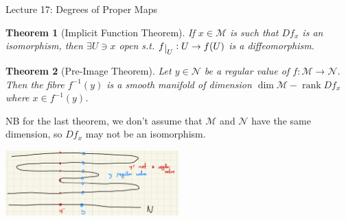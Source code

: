 \documentclass[10pt]{article}
\theoremstyle{plain}
\newtheorem{thm}{Theorem}[section] %
\theoremstyle{definition}
\newcommand{\man}{\mathcal{M}}
\newcommand{\nan}{\mathcal{N}}
\def\restrict#1{\raise-.5ex\hbox{\ensuremath|}_{#1}}
\DeclareMathOperator{\rank}{rank}
\begin{document}
\begin{section}{Lecture 17: Degrees of Proper Maps}
\begin{thm}[Implicit Function Theorem]
If $x\in \man$ is such that $Df_x$ is an isomorphism, then $\exists U \ni x$ open s.t. $f\restrict{U} : U \to f(U)$ is a diffeomorphism.
\end{thm}

\begin{thm}[Pre-Image Theorem]
Let $y\in \nan$ be a regular value of $f : \man \to \nan$. Then the fibre $f^{-1}(y)$ is a smooth manifold of dimension $\dim \man - \rank Df_x$ where $x\in f^{-1}(y)$.
\end{thm}
NB for the last theorem, we don't assume that $\man$ and $\nan$ have the same dimension, so $Df_x$ may not be an isomorphism.
\begin{center}
    \includegraphics[width =0.5\textwidth]{RegularValues.png}
\end{center}


\end{section}
\end{document}
